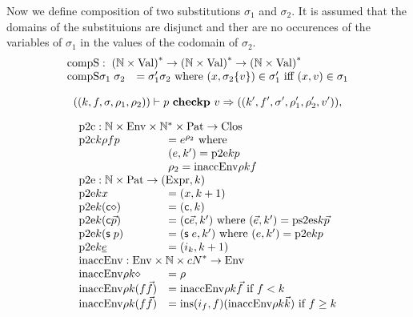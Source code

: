 Now we define composition of two substitutions $\sigma_1$ and $\sigma_2$.
It is assumed that the domains of the substituions are disjunct and
ther are no occurences of the variables of $\sigma_1$ in the values of the codomain of $\sigma_2$.  
\[
\begin{array}{ll}
\multicolumn{2}{l}{\compS : \ves{(\cN \times \Val)} \ra \ves{(\cN \times \Val)} \ra \ves{(\cN \times \Val)}} \\
\compS{\sigma_1}{\sigma_2} & =  \sigma'_1 \sigma_2 \mbox{ where } (x,\subst{\sigma_2}{v}) \in \sigma'_1 \mbox{ iff } (x,v) \in \sigma_1 \\
\end{array}
\]

\newcommand\checkcl[2]{#1\mbox{ \textbf{checkcl}}#2}
\newcommand\checkp[5]{(#1)\vdash#2\mbox{ \textbf{checkp} }#3\Rightarrow (#4),#5}
\newcommand\checkps[5]{(#1)\vdash#2\mbox{ \textbf{checkps} }#3\Rightarrow (#4),#5}
\newcommand\checkinacc[2]{(#1)\vdash\mbox{ \textbf{checkinaccs} }#2}
\newcommand\inst[5]{#1,#2\vdash#3\mbox{ \textbf{inst} }#4\Rightarrow #5}
\newcommand\instlist[5]{#1,#2\vdash#3\mbox{ \textbf{instList} }#4\Rightarrow #5}

\newcommand\ptc{\mathrm{p2c}}
\newcommand\inaccenv{\mathrm{inaccEnv}}
\newcommand\pte{\mathrm{p2e}}
\newcommand\pstes{\mathrm{ps2es}}


\[
\checkp{(k,f,\sigma,\rho_1,\rho_2)}{p}{v}{(k',f',\sigma',\rho'_1,\rho'_2,v')}
\]

\[
\begin{array}{ll}
\multicolumn{2}{l}{\ptc : \cN \times \Env \times \ves{\cN} \times \Pat \ra \Clos}\\
\ptc k \rho f p & = \cl{e}{\rho_2} \mbox{ where } \\
& (e,k') = \pte k p \\
& \rho_2 = \inaccenv \rho k f \\
\multicolumn{2}{l}{\pte : \cN \times \Pat \ra (\Expr,k)}\\
\pte k x & = (x,k+1) \\
\pte k (\cc \diamond) & = (\cc,k) \\
\pte k (\cc \vec{p}) & = (\cc \vec{e},k') \mbox{ where } (\vec{e},k') = \pstes k \vec{p}\\
\pte k (\s p) & = (\s e,k') \mbox{ where } (e,k') = \pte k p\\
\pte k \inacc{e} & = (i_k,k+1) \\
\multicolumn{2}{l}{\inaccenv : \Env \times \cN \times \ves{cN} \ra \Env}\\
\inaccenv \rho k \diamond & = \rho \\
\inaccenv \rho k (f \vec{f}) & = \inaccenv \rho k \vec{f} \mbox{ if } f < k  \\
\inaccenv \rho k (f \vec{f}) & = \ins (i_f,f) (\inaccenv \rho k \vec{k}) \mbox { if } f \geq k 
\end{array}
\]

